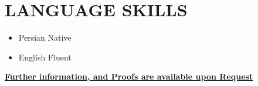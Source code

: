 \documentclass[10pt,a4paper,sans]{moderncv} %
\begin{document}
	\section{LANGUAGE SKILLS}
	
	\begin{itemize}
	\item Persian \hspace{5 pt} Native
	\item English \hspace{6 pt} Fluent   
	\end{itemize} 
	
	
	\vspace{1em}
	

	
	\centerline{\underline{\textbf{	\faExclamationCircle \hspace{0.5 pt}  Further information, and Proofs are available upon Request}}}
	
\end{document}
